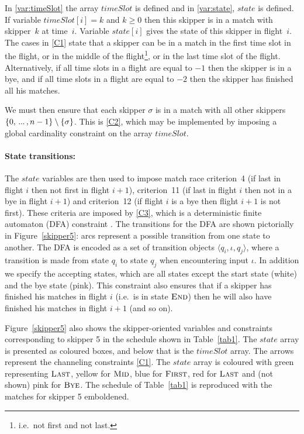 \documentclass{llncs}
\newcommand{\timeSlot}{\mathit{timeSlot}}
\newcommand{\state}{\mathit{state}}
\newcommand{\FIRST}{\textnormal{\textsc{First}}}
\newcommand{\MID}{\textnormal{\textsc{Mid}}}
\newcommand{\LAST}{\textnormal{\textsc{Last}}}
\newcommand{\END}{\textnormal{\textsc{End}}}
\newcommand{\BYE}{\textnormal{\textsc{Bye}}}
\newcommand\nldots{\,\hbox to 0.8em{.\hss.\hss.}\,}
\begin{document}
In \eqref{var:timeSlot} the array $\timeSlot$ is defined and in \eqref{var:state}, $\state$ is
defined. If variable $\timeSlot[{i}] = k$ and $k \geq 0$ then this skipper is in a match with
skipper~$k$ at time~$i$. Variable $\state[{i}]$ gives the state of this skipper in flight~$i$. The
cases in \eqref{C1} state that a skipper can be in a match in the first time slot in the flight, or in
the middle of the flight\footnote{i.e.\ not first and not last.}, or in the last time
slot of the flight. Alternatively, if all time slots in a flight are equal to $-1$ then the skipper
is in a bye, and if all time slots in a flight are equal to $-2$ then the skipper has finished all
his matches.

We must then ensure that each skipper $\sigma$ is in a match with all other skippers $\{0, \nldots,
n-1\} \setminus \{\sigma\}$. This is \eqref{C2}, which may be implemented by imposing a global
cardinality constraint \cite{globCard} on the array $\timeSlot$.

\paragraph{State transitions:} The $\state$ variables are then used to impose match race criterion~4
(if last in flight $i$ then not first in flight $i+1$), criterion~11 (if last in flight $i$ then not
in a bye in flight $i+1$) and criterion~12 (if flight $i$ is a bye then flight $i+1$ is not first).
These criteria are imposed by \eqref{C3}, which is a deterministic finite automaton (DFA) constraint
\cite{Pesant04}. The transitions for the DFA are shown pictorially in Figure~\ref{skipper5}: arcs
represent a possible transition from one state to another. The DFA is encoded as a set of transition objects
$\langle q_{i},\iota,q_{j} \rangle$, where a transition is made from state $q_{i}$ to state $q_{j}$
when encountering input $\iota$. In addition we specify the accepting states, which are all states
except the start state (white) and the bye state (pink).  This constraint also ensures that if a
skipper has finished his matches in flight $i$ (i.e.\ is in state $\END$) then he will also have
finished his matches in flight $i+1$ (and so on).

Figure~\ref{skipper5} also shows the skipper-oriented variables and constraints corresponding to
skipper 5 in the schedule shown in Table~\ref{tab1}. The $\state$ array is presented as coloured boxes, and
below that is the $\timeSlot$ array. The arrows represent the channeling constraints \eqref{C1}. The
$\state$ array is coloured with green representing $\LAST$, yellow for $\MID$, blue for $\FIRST$,
red for $\LAST$ and (not shown) pink for $\BYE$. The schedule of Table~\ref{tab1} is reproduced with
the matches for skipper 5 emboldened.
\end{document}
